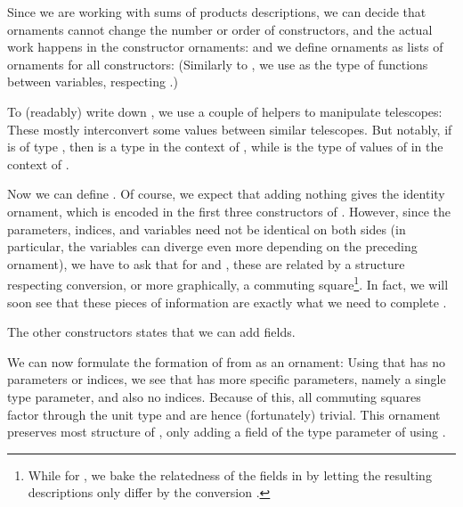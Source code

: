 Since we are working with sums of products descriptions, we can decide that ornaments cannot change the number or order of constructors, and the actual work happens in the constructor ornaments:
and we define ornaments as lists of ornaments for all constructors:
(Similarly to , we use  as the type of functions between variables, respecting .)

To (readably) write down , we use a couple of helpers to manipulate telescopes:
These mostly interconvert some values between similar telescopes. But notably, if  is of type , then  is a type in the context of , while  is the type of values of  in the context of .

Now we can define . Of course, we expect that adding nothing gives the identity ornament, which is encoded in the first three constructors of .
However, since the parameters, indices, and variables need not be identical on both sides (in particular, the variables can diverge even more depending on the preceding ornament), we have to ask that for  and , these are related by a structure respecting conversion, or more graphically, a commuting square\footnote{While for , we bake the relatedness of the fields in by letting the resulting descriptions only differ by the conversion .}. In fact, we will soon see that these pieces of information are exactly what we need to complete .

The other constructors  states that we can add fields.

We can now formulate the formation of  from \bN{} as an ornament:
Using that \bN{} has no parameters or indices, we see that  has more specific parameters, namely a single type parameter, and also no indices. Because of this, all commuting squares factor through the unit type and are hence (fortunately) trivial. This ornament preserves most structure of \bN{}, only adding a field of the type parameter of  using .

